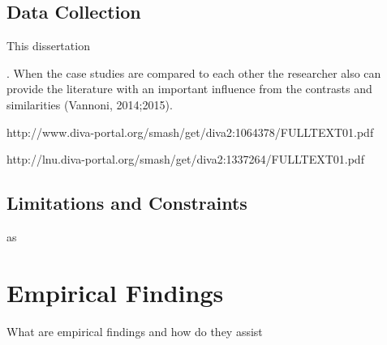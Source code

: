 \documentclass[11pt,a4paper]{article}
\begin{document}
{{%


\subsection{Data Collection}
This dissertation 

. When the case studies are compared to each other the
researcher also can provide the literature with an important influence from
the contrasts and similarities (Vannoni, 2014;2015). 

http://www.diva-portal.org/smash/get/diva2:1064378/FULLTEXT01.pdf

http://lnu.diva-portal.org/smash/get/diva2:1337264/FULLTEXT01.pdf

\subsection{Limitations and Constraints}

as

\section{Empirical Findings}
\label{emp_findings}
What are empirical findings and how do they assist
}}
\end{document}
